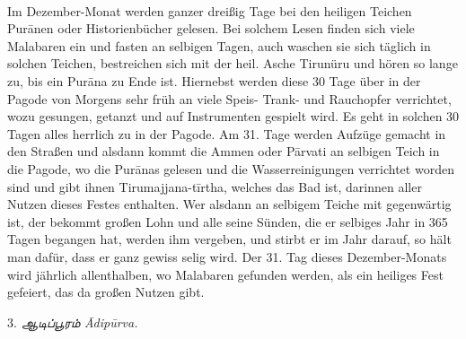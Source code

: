 \documentclass{article}
\newcommand{\TamilText}[1]{\texttamil{#1}}
\newcommand{\tam}[1]{\TamilText{#1}}
\begin{document}
\paragraph{}
Im Dezember-Monat werden ganzer dreißig Tage bei den heiligen Teichen Pur\={a}nen oder Historienbücher gelesen. Bei solchem Lesen finden sich viele Malabaren ein und fasten an selbigen Tagen, auch waschen sie sich täglich in solchen Teichen, bestreichen sich mit der heil. Asche Tirunüru und hören so lange zu, bis ein Pur\={a}na zu Ende ist. Hiernebst werden diese 30 Tage über in der Pagode von Morgens sehr früh an viele Speis- Trank- und Rauchopfer verrichtet, wozu gesungen, getanzt und auf Instrumenten gespielt wird. Es geht in solchen 30 Tagen alles herrlich zu in der Pagode. Am 31. Tage werden Aufzüge gemacht in den Straßen und alsdann kommt die Ammen oder P\={a}rvati an selbigen Teich in die Pagode, wo die Pur\={a}nas gelesen und die Wasserreinigungen verrichtet worden sind und gibt ihnen Tirumajjana-t\={i}rtha, welches das Bad ist, darinnen aller Nutzen dieses Festes enthalten. Wer alsdann an selbigem Teiche mit gegenwärtig ist, der bekommt großen Lohn und alle seine Sünden, die er selbiges Jahr in 365 Tagen begangen hat, werden ihm vergeben, und stirbt er im Jahr darauf, so hält man dafür, dass er ganz gewiss selig wird. Der 31. Tag dieses Dezember-Monats wird jährlich allenthalben, wo Malabaren gefunden werden, als ein heiliges Fest gefeiert, das da großen Nutzen gibt.

\begin{center}
3. \emph{\tam{ஆடிப்பூரம்} \={A}dip\={u}rva.}
\end{center}
\end{document}
